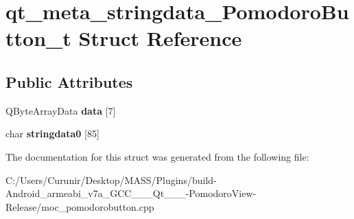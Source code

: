\hypertarget{structqt__meta__stringdata___pomodoro_button__t}{}\section{qt\+\_\+meta\+\_\+stringdata\+\_\+\+Pomodoro\+Button\+\_\+t Struct Reference}
\label{structqt__meta__stringdata___pomodoro_button__t}
\subsection*{Public Attributes}
\begin{DoxyCompactItemize}
\item 
\mbox{\label{structqt__meta__stringdata___pomodoro_button__t_a3dd2e0df6dec6c450c51fc6a05e9428a}} 
Q\+Byte\+Array\+Data {\bfseries data} \mbox{[}7\mbox{]}
\item 
\mbox{\label{structqt__meta__stringdata___pomodoro_button__t_ae09552d59d8226a338af96b2ca404117}} 
char {\bfseries stringdata0} \mbox{[}85\mbox{]}
\end{DoxyCompactItemize}


The documentation for this struct was generated from the following file\+:\begin{DoxyCompactItemize}
\item 
C\+:/\+Users/\+Curunir/\+Desktop/\+M\+A\+S\+S/\+Plugins/build-\/\+Android\+\_\+armeabi\+\_\+v7a\+\_\+\+G\+C\+C\+\_\+\_\+\_\+\+Qt\+\_\+\_\+\_-\/\+Pomodoro\+View-\/\+Release/moc\+\_\+pomodorobutton.\+cpp\end{DoxyCompactItemize}
